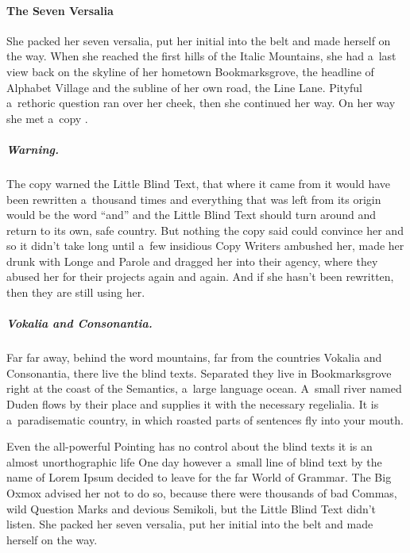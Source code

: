\documentclass[12pt, a4paper, oneside]{article}
\theoremstyle{Plain}
\theoremstyle{Definition}
\theoremstyle{Remark}
\begin{document}
\paragraph{The Seven Versalia}
She packed her seven versalia, put her initial into the belt and made herself on the way. When she reached the first hills of the Italic Mountains, she had a~last view back on the skyline of her hometown Bookmarksgrove, the headline of Alphabet Village and the subline of her own road, the Line Lane. Pityful a~rethoric question ran over her cheek, then she continued her way. On her way she met a~copy \citep{shore}.

\subparagraph{Warning.} The copy warned the Little Blind Text, that where it came from it would have been rewritten a~thousand times and everything that was left from its origin would be the word ``and'' and the Little Blind Text should turn around and return to its own, safe country. But nothing the copy said could convince her and so it didn't take long until a~few insidious Copy Writers ambushed her, made her drunk with Longe and Parole and dragged her into their agency, where they abused her for their projects again and again. And if she hasn't been rewritten, then they are still using her.

\subparagraph{Vokalia and Consonantia.} Far far away, behind the word mountains, far from the countries Vokalia and Consonantia, there live the blind texts. Separated they live in Bookmarksgrove right at the coast of the Semantics, a~large language ocean. A~small river named Duden flows by their place and supplies it with the necessary regelialia. It is a~paradisematic country, in which roasted parts of sentences fly into your mouth.

Even the all-powerful Pointing has no control about the blind texts it is an almost unorthographic life One day however a~small line of blind text by the name of Lorem Ipsum decided to leave for the far World of Grammar. The Big Oxmox advised her not to do so, because there were thousands of bad Commas, wild Question Marks and devious Semikoli, but the Little Blind Text didn't listen. She packed her seven versalia, put her initial into the belt and made herself on the way.
\end{document}
